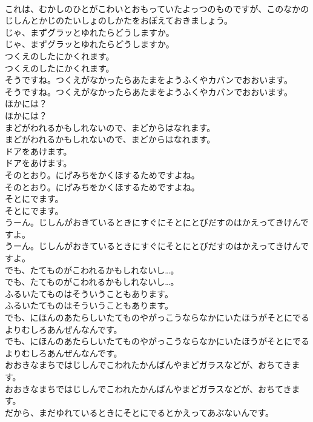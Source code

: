 \documentclass[8pt]{extreport}
\begin{document}
\begin{CJK}{UTF8}{min}
\\	これは、むかしのひとがこわいとおもっていたよっつのものですが、このなかのじしんとかじのたいしょのしかたをおぼえておきましょう。 
\\	じゃ、まずグラッとゆれたらどうしますか。	
\\	じゃ、まずグラッとゆれたらどうしますか。 
\\	つくえのしたにかくれます。	
\\	つくえのしたにかくれます。 
\\	そうですね。つくえがなかったらあたまをようふくやカバンでおおいます。	
\\	そうですね。つくえがなかったらあたまをようふくやカバンでおおいます。 
\\	ほかには？	
\\	ほかには？ 
\\	まどがわれるかもしれないので、まどからはなれます。	
\\	まどがわれるかもしれないので、まどからはなれます。 
\\	ドアをあけます。	
\\	ドアをあけます。 
\\	そのとおり。にげみちをかくほするためですよね。	
\\	そのとおり。にげみちをかくほするためですよね。 
\\	そとにでます。	
\\	そとにでます。 
\\	うーん。じしんがおきているときにすぐにそとにとびだすのはかえってきけんですよ。	
\\	うーん。じしんがおきているときにすぐにそとにとびだすのはかえってきけんですよ。 
\\	でも、たてものがこわれるかもしれないし…。	
\\	でも、たてものがこわれるかもしれないし…。 
\\	ふるいたてものはそういうこともあります。	
\\	ふるいたてものはそういうこともあります。 
\\	でも、にほんのあたらしいたてものやがっこうならなかにいたほうがそとにでるよりむしろあんぜんなんです。	
\\	でも、にほんのあたらしいたてものやがっこうならなかにいたほうがそとにでるよりむしろあんぜんなんです。 
\\	おおきなまちではじしんでこわれたかんばんやまどガラスなどが、おちてきます。	
\\	おおきなまちではじしんでこわれたかんばんやまどガラスなどが、おちてきます。 
\\	だから、まだゆれているときにそとにでるとかえってあぶないんです。	

\end{CJK}
\end{document}
